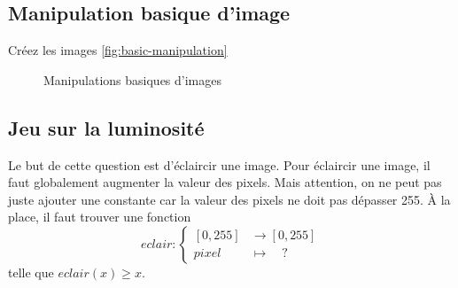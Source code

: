 \subsection{Manipulation basique d'image}

\ques Créez les images \autoref{fig:basic-manipulation}

\begin{figure}[!h]
    \begin{center}
    \end{center}
    \caption{Manipulations basiques d'images}
    \label{fig:basic-manipulation}
\end{figure}

\subsection{Jeu sur la luminosité}

Le but de cette question est d'éclaircir une image. Pour éclaircir une image, il faut globalement augmenter la valeur des pixels. Mais attention, on ne peut pas juste ajouter une constante car la valeur des pixels ne doit pas dépasser 255. À la place, il faut trouver une fonction \[
    eclair:
    \begin{cases}
        [0, 255] &\rightarrow [0, 255]\\
        pixel &\mapsto \quad ?
    \end{cases}
\]
telle que $ eclair(x) \geq x $.

